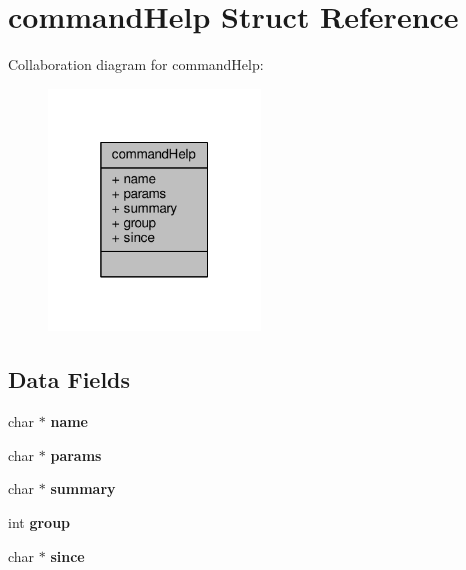 \hypertarget{structcommandHelp}{}\section{command\+Help Struct Reference}
\label{structcommandHelp}


Collaboration diagram for command\+Help\+:\nopagebreak
\begin{figure}[H]
\begin{center}
\leavevmode
\includegraphics[width=160pt]{structcommandHelp__coll__graph}
\end{center}
\end{figure}
\subsection*{Data Fields}
\begin{DoxyCompactItemize}
\item 
\mbox{\label{structcommandHelp_af9eb2e7147a85ca61399a9362d8f3bca}} 
char $\ast$ {\bfseries name}
\item 
\mbox{\label{structcommandHelp_a2f79db81119f42010852d00341e3d23e}} 
char $\ast$ {\bfseries params}
\item 
\mbox{\label{structcommandHelp_ad4ea8c85da889c0e3afb61a753ace373}} 
char $\ast$ {\bfseries summary}
\item 
\mbox{\label{structcommandHelp_aa62d526b0ceb5e0840f1ebc710e2e31d}} 
int {\bfseries group}
\item 
\mbox{\label{structcommandHelp_a8d06ba546d92db2e1a4590eaa1116c1f}} 
char $\ast$ {\bfseries since}
\end{DoxyCompactItemize}


